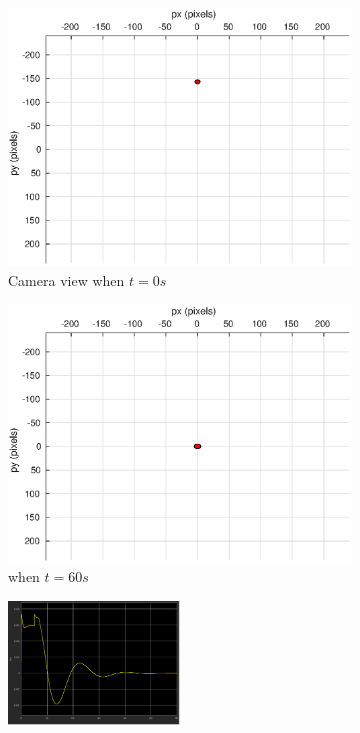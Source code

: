 \begin{figure}
\begin{subfigure}[b]{0.45\linewidth}
		\includegraphics[width=\textwidth]{images/chapter4/image_camera_0mps}
		\caption{Camera view when $t=0s$}
	\end{subfigure}
	\begin{subfigure}[b]{0.45\linewidth}
		\includegraphics[width=\textwidth]{images/chapter4/image_camera_0mps_60s}
		\caption{when $t=60s$}
	\end{subfigure}
	\begin{subfigure}[b]{0.8\linewidth}
		\centering
		\includegraphics[width=0.5\textwidth]{images/chapter4/image_Ex_0mps}

\end{subfigure}
\end{figure}
